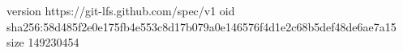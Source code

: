 version https://git-lfs.github.com/spec/v1
oid sha256:58d485f2e0e175fb4e553c8d17b079a0e146576f4d1e2c68b5def48de6ae7a15
size 149230454

